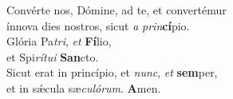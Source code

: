 \oddverse Convérte nos, Dómine, ad te, et convertémur~\*\\
\oddverse ínnova dies nostros, sicut \textit{a} \textit{prin}\textbf{cí}pio.\\
\evenverse Glória Pa\textit{tri}, \textit{et} \textbf{Fí}lio,~\*\\
\evenverse et Spi\textit{rí}\textit{tu}\textit{i} \textbf{San}cto.\\
\oddverse Sicut erat in princípio, et \textit{nunc}, \textit{et} \textbf{sem}per,~\*\\
\oddverse et in sǽcula sæ\textit{cu}\textit{ló}\textit{rum}. \textbf{A}men.\\
